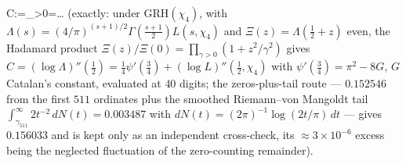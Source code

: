 C\;:=\;\sum_{\gamma>0}\;=\ldots
\]
(exactly: under GRH$(\chi_4)$, with
$\Lambda(s)=(4/\pi)^{(s+1)/2}\Gamma(\tfrac{s+1}2)L(s,\chi_4)$ and
$\Xi(z)=\Lambda(\tfrac12+z)$ even, the Hadamard product
$\Xi(z)/\Xi(0)=\prod_{\gamma>0}(1+z^2/\gamma^2)$ gives
$C=(\log\Lambda)''(\tfrac12)
=\tfrac14\psi'(\tfrac34)+(\log L)''(\tfrac12,\chi_4)$ with
$\psi'(\tfrac34)=\pi^2-8G$, $G$ Catalan's constant, evaluated at $40$
digits; the zeros-plus-tail route --- $0.152546$ from the first $511$
ordinates plus the smoothed Riemann--von Mangoldt tail
$\int_{\gamma_{511}}^\infty2t^{-2}\,dN(t)=0.003487$ with
$dN(t)=(2\pi)^{-1}\log(2t/\pi)\,dt$ --- gives $0.156033$ and is kept
only as an independent cross-check, its $\approx3\times10^{-6}$ excess
being the neglected fluctuation of the zero-counting remainder).

%

